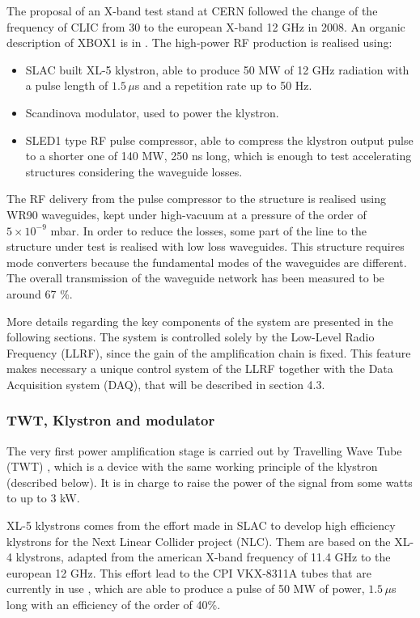 The proposal of an X-band test stand at CERN followed the change of the frequency of CLIC from 30 to the european X-band 12 GHz in 2008. An organic description of XBOX1 is in \cite{Woolley:2015,Kovermann:1459879}. The high-power RF production is realised using:
\begin{itemize}
\item SLAC built XL-5 klystron, able to produce 50 MW of 12 GHz radiation with a pulse length of $1.5\, \mu$s and a repetition rate up to 50 Hz.
\item Scandinova modulator, used to power the klystron.
\item SLED1 type RF pulse compressor, able to compress the klystron output pulse to a shorter one of 140 MW, 250 ns long, which is enough to test accelerating structures considering the waveguide losses.
\end{itemize}

The RF delivery from the pulse compressor to the structure is realised using WR90 waveguides, kept under high-vacuum at a pressure of the order of\\ $5\times10^{-9}$ mbar. In order to reduce the losses, some part of the line to the structure under test is realised with low loss waveguides. This structure requires mode converters because the fundamental modes of the waveguides are different. The overall transmission of the waveguide network has been measured to be around 67 \%.

More details regarding the key components of the system are presented in the following sections. The system is controlled solely by the Low-Level Radio Frequency (LLRF), since the gain of the amplification chain is fixed. This feature makes necessary a unique control system of the LLRF together with the Data Acquisition system (DAQ), that will be described in section 4.3.


\subsubsection{TWT, Klystron and modulator}

The very first power amplification stage is carried out by Travelling Wave Tube (TWT) \cite{appSys:twt}, which is a device with the same working principle of the klystron (described below). It is in charge to raise the power of the signal from some watts to up to 3 kW.

XL-5 klystrons comes from the effort made in SLAC to develop high efficiency klystrons for the Next Linear Collider project (NLC). Them are based on the XL-4 klystrons, adapted from the american X-band frequency of 11.4 GHz to the european 12 GHz. This effort lead to the CPI VKX-8311A tubes that are currently in use \cite{klystron:CPI}, which are able to produce a pulse of 50 MW of power, $1.5 \, \mu$s long with an efficiency of the order of 40\%.
 
